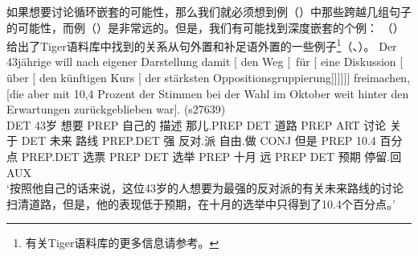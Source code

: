 \largerpage[1]
如果想要讨论循环嵌套的可能性，那么我们就必须想到例（）中那些跨越几组句子的可能性，而例（）是非常远的。但是，我们有可能找到深度嵌套的个例：
（）给出了Tiger语料库中找到的关系从句外置和补足语外置的一些例子\footnote{
有关Tiger语料库的更多信息请参考。
}（\citealp[--79]{Mueller2007c}、\citealp[Section~2.1]{MM2009a}）。
\eal
\ex 
\gll Der 43jährige will nach eigener Darstellung damit [ den Weg [~für [ eine
  Diskussion [ über [ den künftigen Kurs [ der stärksten
  Oppositions\-gruppierung]]]]]] freimachen, [die aber mit 10,4 Prozent
  der Stimmen bei der Wahl im Oktober weit hinter den Erwartungen zurückgeblieben war]. (s27639)\\
  DET 43岁 想要 PREP 自己的 描述 那儿.PREP {} DET 道路 \hspaceThis{[\sub{PP}~}PREP {} ART 讨论 {} 关于 {} DET 未来 路线 {} PREP.DET 强
  反对.派 自由.做 \spacebr{}CONJ 但是 PREP 10.4 百分点
  PREP.DET 选票 PREP DET 选举 PREP 十月 远 PREP DET 预期 停留.回 AUX\\
\glt `按照他自己的话来说，这位43岁的人想要为最强的反对派的有关未来路线的讨论扫清道路，但是，他的表现低于预期，在十月的选举中只得到了10.4个百分点。'
